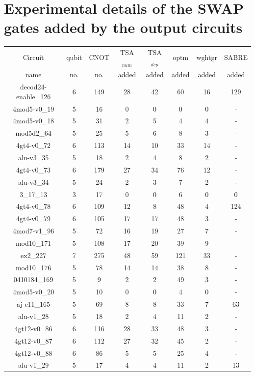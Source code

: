 \documentclass[runningheads]{llncs}
\begin{document}
\section{Experimental details of the SWAP gates added by the output circuits}
\begin{table}[H]
	\begin{center}  
	\begin{tabular}{|c|c|c|c|c|c|c|c|}
	\hline
	Circuit &  qubit  & CNOT &TSA$_{num}$& TSA$_{dep}$  & optm 	 & wghtgr  &SABRE 	\\
	 name	&   no. 	&	no. & added&  added &  added 	&  added&  added\\
	\hline
	decod24-enable\_126 & 6 & 149 & 28 & 42 & 60 & 16 &129\\ 
4mod5-v0\_19 & 5 & 16 & 0 & 0 & 0 & 0&- \\ 
4mod5-v0\_18 & 5 & 31 & 2 & 5 & 4 & 4 &-\\ 
mod5d2\_64 & 5 & 25 & 5 & 6 & 8 & 3&- \\ 
4gt4-v0\_72 & 6 & 113 & 14 & 10 & 33 & 14&- \\ 
alu-v3\_35 & 5 & 18 & 2 & 4 & 8 & 2 &-\\ 
4gt4-v0\_73 & 6 & 179 & 27 & 34 & 76 & 12&- \\ 
alu-v3\_34 & 5 & 24 & 2 & 3 & 7 & 2& - 	\\
3\_17\_13 & 3 & 17 & 0 & 0 & 6 & 0& 0 	\\
4gt4-v0\_78 & 6 & 109 & 12 & 8 & 48 & 4& 124 	\\
4gt4-v0\_79 & 6 & 105 & 17 & 17 & 48 & 3& - 	\\
4mod7-v1\_96 & 5 & 72 & 16 & 19 & 27 & 7& - 	\\
mod10\_171 & 5 & 108 & 17 & 20 & 39 & 9& - 	\\
ex2\_227 & 7 & 275 & 48 & 59 & 121 & 33& - 	\\
mod10\_176 & 5 & 78 & 14 & 14 & 38 & 8& - 	\\
0410184\_169 & 5 & 9 & 2 & 2 & 49 & 3& - 	\\
4mod5-v0\_20 & 5 & 10 & 0 & 0 & 4 & 0& - 	\\
aj-e11\_165 & 5 & 69 & 8 & 8 & 33 & 7& 63 	\\
alu-v1\_28 & 5 & 18 & 2 & 4 & 11 & 2& - 	\\
4gt12-v0\_86 & 6 & 116 & 28 & 33 & 48 & 3& - 	\\
4gt12-v0\_87 & 6 & 112 & 27 & 32 & 45 & 2& - 	\\
4gt12-v0\_88 & 6 & 86 & 5 & 5 & 25 & 4& - 	\\
alu-v1\_29 & 5 & 17 & 4 & 4 & 11 & 2& 13 	\\

\end{tabular}
\end{center}
\end{table}
\end{document}
